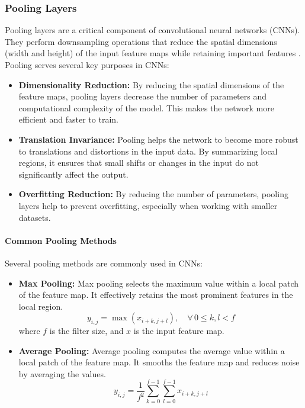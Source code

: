 \documentclass[english,11pt,a4paper,titlepage]{article}
\begin{document}
	\subsubsection*{Pooling Layers}
	Pooling layers are a critical component of convolutional neural networks (CNNs). They perform downsampling operations that reduce the spatial dimensions (width and height) of the input feature maps while retaining important features \cite{nirthikaPoolingConvolutionalNeural2022}. Pooling serves several key purposes in CNNs:
	\begin{itemize}
		\item \textbf{Dimensionality Reduction:} By reducing the spatial dimensions of the feature maps, pooling layers decrease the number of parameters and computational complexity of the model. This makes the network more efficient and faster to train.
		\item \textbf{Translation Invariance:} Pooling helps the network to become more robust to translations and distortions in the input data. By summarizing local regions, it ensures that small shifts or changes in the input do not significantly affect the output.
		\item \textbf{Overfitting Reduction:} By reducing the number of parameters, pooling layers help to prevent overfitting, especially when working with smaller datasets.
	\end{itemize}
	
	\paragraph{Common Pooling Methods}
	Several pooling methods are commonly used in CNNs:
	\begin{itemize}
		\item \textbf{Max Pooling:} Max pooling selects the maximum value within a local patch of the feature map. It effectively retains the most prominent features in the local region.
		\begin{equation*}
			y_{i,j} = \max \left( x_{i+k,j+l} \right), \quad \forall \, 0 \leq k,l < f
		\end{equation*}
		where \( f \) is the filter size, and \( x \) is the input feature map.
		
		\item \textbf{Average Pooling:} Average pooling computes the average value within a local patch of the feature map. It smooths the feature map and reduces noise by averaging the values.
		\begin{equation*}
			y_{i,j} = \frac{1}{f^2} \sum_{k=0}^{f-1} \sum_{l=0}^{f-1} x_{i+k,j+l}
		\end{equation*}
	\end{itemize}
	
\end{document}

